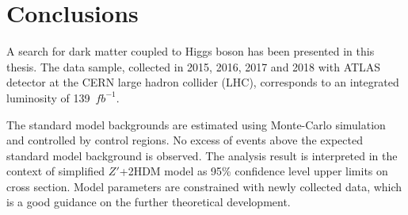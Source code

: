 \chapter{Conclusions}

\label{ch:con}

\par A search for dark matter coupled to Higgs boson has been presented in this thesis. 
The data sample, collected in 2015, 2016, 2017 and 2018 with ATLAS detector at the CERN large hadron collider (LHC), corresponds to an integrated luminosity of 139~$fb^{-1}$. 

\par The standard model backgrounds are estimated using Monte-Carlo simulation and controlled by control regions. 
No excess of events above the expected standard model background is observed. 
The analysis result is interpreted in the context of simplified $Z\prime$+2HDM model as 95\% confidence level upper limits on cross section. 
Model parameters are constrained with newly collected data, which is a good guidance on the further theoretical development.
